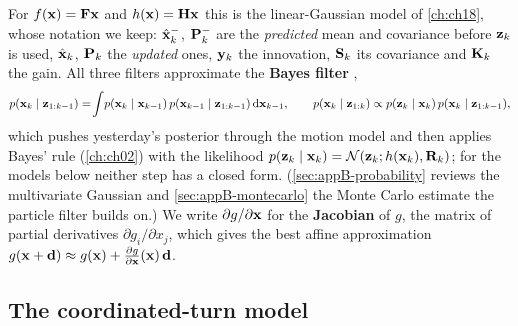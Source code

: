 For $f(\mathbf{x}) = \mathbf{F}\mathbf{x}$ and $h(\mathbf{x}) = \mathbf{H}\mathbf{x}$ this is the
linear-Gaussian model of \cref{ch:ch18}, whose notation we keep:
$\hat{\mathbf{x}}_k^-$, $\mathbf{P}_k^-$ are the \emph{predicted} mean and covariance
before $\mathbf{z}_k$ is used, $\hat{\mathbf{x}}_k$, $\mathbf{P}_k$ the \emph{updated}
ones, $\mathbf{y}_k$ the innovation, $\mathbf{S}_k$ its covariance and $\mathbf{K}_k$
the gain. All three filters approximate the \textbf{Bayes filter}
 \cite{thrun2005probabilistic},
\begin{equation}
  p(\mathbf{x}_k \mid \mathbf{z}_{1:k-1}) = \!\int\! p(\mathbf{x}_k \mid \mathbf{x}_{k-1})\,
    p(\mathbf{x}_{k-1} \mid \mathbf{z}_{1:k-1})\, \mathrm{d}\mathbf{x}_{k-1},
  \qquad
  p(\mathbf{x}_k \mid \mathbf{z}_{1:k}) \propto p(\mathbf{z}_k \mid \mathbf{x}_k)\,
    p(\mathbf{x}_k \mid \mathbf{z}_{1:k-1}),
  \label{eq:ch19-bayes}
\end{equation}
which pushes yesterday's posterior through the motion model and then applies
Bayes' rule (\cref{ch:ch02}) with the likelihood $p(\mathbf{z}_k \mid \mathbf{x}_k) =
\mathcal{N}(\mathbf{z}_k; h(\mathbf{x}_k), \mathbf{R}_k)$; for the models below neither
step has a closed form. (\cref{sec:appB-probability} reviews the multivariate
Gaussian and \cref{sec:appB-montecarlo} the Monte Carlo estimate the particle
filter builds on.) We write $\partial g/\partial\mathbf{x}$ for the \textbf{Jacobian}
of $g$, the matrix of partial derivatives $\partial g_i/\partial x_j$, which
gives the best affine approximation $g(\mathbf{x} + \mathbf{d}) \approx g(\mathbf{x}) +
\frac{\partial g}{\partial\mathbf{x}}(\mathbf{x})\,\mathbf{d}$.

\subsection{The coordinated-turn model}
\label{sec:ch19-ct}

